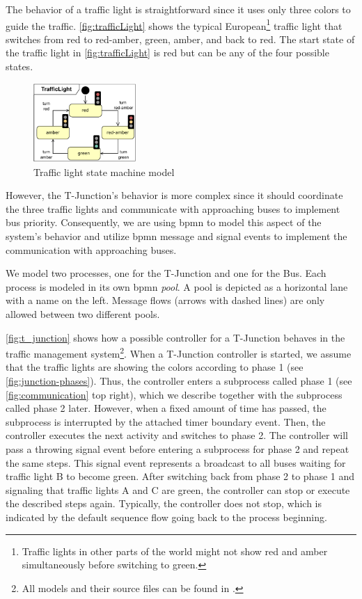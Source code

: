\documentclass{jot}
\begin{document}
The behavior of a traffic light is straightforward since it uses only three colors to guide the traffic.
\autoref{fig:trafficLight} shows the typical European\footnote{Traffic lights in other parts of the world might not show red and amber simultaneously before switching to green.} traffic light that switches from \textsf{red} to \textsf{red-amber}, \textsf{green}, \textsf{amber}, and back to \textsf{red}.
The start state of the traffic light in \autoref{fig:trafficLight} is \textsf{red} but can be any of the four possible states.

\begin{figure}[h]
    \centering
    \includegraphics[width=0.35\textwidth]{figures/trafficLight.pdf}
    \caption{Traffic light state machine model}
    \label{fig:trafficLight}
\end{figure}

However, the T-Junction's behavior is more complex since it should coordinate the three traffic lights and communicate with approaching buses to implement bus priority.
Consequently, we are using \gls*{bpmn} to model this aspect of the system's behavior and utilize \gls*{bpmn} message and signal events to implement the communication with approaching buses.

We model two processes, one for the T-Junction and one for the Bus.
Each process is modeled in its own \gls*{bpmn} \emph{pool}.
A pool is depicted as a horizontal lane with a name on the left.
Message flows (arrows with dashed lines) are only allowed between two different pools.

\autoref{fig:t_junction} shows how a possible controller for a T-Junction behaves in the traffic management system\footnote{All models and their source files can be found in \cite{krauterArtifactsBehavioralConsistency2022}.\label{footnote:fullModels}}.
When a T-Junction controller is started, we assume that the traffic lights are showing the colors according to phase 1 (see \autoref{fig:junction-phases}).
Thus, the controller enters a subprocess called phase 1 (see \autoref{fig:communication} top right), which we describe together with the subprocess called phase 2 later.
However, when a fixed amount of time has passed, the subprocess is interrupted by the attached timer boundary event.
Then, the controller executes the next activity and switches to phase 2.
The controller will pass a throwing signal event before entering a subprocess for phase 2 and repeat the same steps.
This signal event represents a broadcast to all buses waiting for traffic light B to become green.
After switching back from phase 2 to phase 1 and signaling that traffic lights A and C are green, the controller can stop or execute the described steps again.
Typically, the controller does not stop, which is indicated by the default sequence flow going back to the process beginning.
\end{document}
